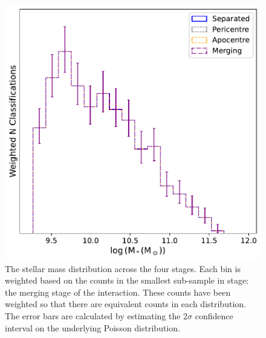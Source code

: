 \begin{figure}
\centering
\includegraphics[width = \textwidth]{Chapter3/figures/stellar-mass-dist.pdf}
\caption[The stellar mass distribution across the four stages.]{The stellar mass distribution across the four stages. Each bin is weighted based on the counts in the smallest sub-sample in stage: the merging stage of the interaction. These counts have been weighted so that there are equivalent counts in each distribution. The error bars are calculated by estimating the 2$\sigma$ confidence interval on the underlying Poisson distribution.}
\label{fig:weighted-mass}
\end{figure}

